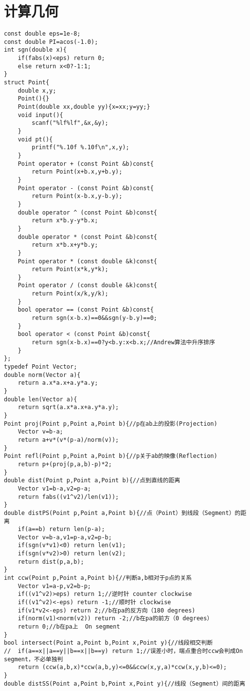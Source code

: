 \documentclass[UTF8]{ctexart}
\begin{document}
\section{计算几何}
\begin{lstlisting}
const double eps=1e-8;
const double PI=acos(-1.0);
int sgn(double x){
    if(fabs(x)<eps) return 0;
    else return x<0?-1:1;
}
struct Point{
    double x,y;
    Point(){}
    Point(double xx,double yy){x=xx;y=yy;}
    void input(){
        scanf("%lf%lf",&x,&y);
    }
    void pt(){
        printf("%.10f %.10f\n",x,y);
    }
    Point operator + (const Point &b)const{
        return Point(x+b.x,y+b.y);
    }
    Point operator - (const Point &b)const{
        return Point(x-b.x,y-b.y);
    }
    double operator ^ (const Point &b)const{
        return x*b.y-y*b.x;
    }
    double operator * (const Point &b)const{
        return x*b.x+y*b.y;
    }
    Point operator * (const double &k)const{
        return Point(x*k,y*k); 
    }
    Point operator / (const double &k)const{
        return Point(x/k,y/k); 
    }
    bool operator == (const Point &b)const{
        return sgn(x-b.x)==0&&sgn(y-b.y)==0;
    }
    bool operator < (const Point &b)const{
        return sgn(x-b.x)==0?y<b.y:x<b.x;//Andrew算法中升序排序 
    }
};
typedef Point Vector;
double norm(Vector a){
    return a.x*a.x+a.y*a.y;
}
double len(Vector a){
    return sqrt(a.x*a.x+a.y*a.y);
}
Point proj(Point p,Point a,Point b){//p在ab上的投影(Projection)
    Vector v=b-a;
    return a+v*(v*(p-a)/norm(v));
}
Point refl(Point p,Point a,Point b){//p关于ab的映像(Reflection)
    return p+(proj(p,a,b)-p)*2;
}
double dist(Point p,Point a,Point b){//点到直线的距离 
    Vector v1=b-a,v2=p-a;
    return fabs((v1^v2)/len(v1));
}
double distPS(Point p,Point a,Point b){//点（Point）到线段（Segment）的距离 
    if(a==b) return len(p-a);
    Vector v=b-a,v1=p-a,v2=p-b;
    if(sgn(v*v1)<0) return len(v1);
    if(sgn(v*v2)>0) return len(v2);
    return dist(p,a,b);
}
int ccw(Point p,Point a,Point b){//判断a,b相对于p点的关系 
    Vector v1=a-p,v2=b-p;
    if((v1^v2)>eps) return 1;//逆时针 counter clockwise
    if((v1^v2)<-eps) return -1;//顺时针 clockwise
    if(v1*v2<-eps) return 2;//b在pa的反方向（180 degrees)
    if(norm(v1)<norm(v2)) return -2;//b在pa的前方（0 degrees） 
    return 0;//b在pa上  On segment 
}
bool intersect(Point a,Point b,Point x,Point y){//线段相交判断 
//	if(a==x||a==y||b==x||b==y) return 1;//误差小时，端点重合时ccw会判成On segment，不必单独判 
    return (ccw(a,b,x)*ccw(a,b,y)<=0&&ccw(x,y,a)*ccw(x,y,b)<=0);
}
double distSS(Point a,Point b,Point x,Point y){//线段（Segment）间的距离 

\end{lstlisting}
\end{document}
